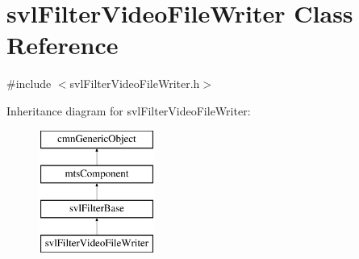 \hypertarget{classsvl_filter_video_file_writer}{}\section{svl\+Filter\+Video\+File\+Writer Class Reference}
\label{classsvl_filter_video_file_writer}


{\ttfamily \#include $<$svl\+Filter\+Video\+File\+Writer.\+h$>$}

Inheritance diagram for svl\+Filter\+Video\+File\+Writer\+:\begin{figure}[H]
\begin{center}
\leavevmode
\includegraphics[height=4.000000cm]{d4/dcc/classsvl_filter_video_file_writer}
\end{center}
\end{figure}
